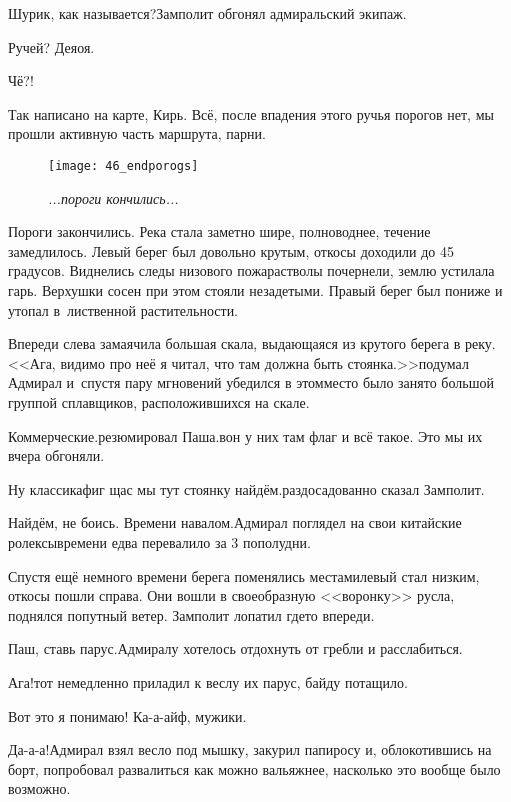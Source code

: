 \diagdash Шурик, как называется?\mdash Замполит обгонял адмиральский экипаж.

\diagdash Ручей? Деяоя.

\diagdash Чё?!

\diagdash Так написано на карте, Кирь. Всё, после впадения этого ручья порогов нет, мы прошли активную часть маршрута, парни.

\begin{figure}[h]
	\centering
	\texttt{[image: 46\_endporogs]}
	\caption{\small\textit{...пороги кончились...}}
\end{figure}

Пороги закончились. Река стала заметно шире, полноводнее, течение замедлилось. Левый берег был довольно крутым, откосы доходили до 45 градусов. Виднелись следы низового пожара\mdash стволы почернели, землю устилала гарь. Верхушки сосен при этом стояли незадетыми. Правый берег был пониже и утопал в~лиственной растительности. 

Впереди слева замаячила большая скала, выдающаяся из крутого берега в реку. <<Ага, видимо про неё я читал, что там должна быть стоянка.>>\mdash подумал Адмирал и~спустя пару мгновений убедился в этом\mdash место было занято большой группой сплавщиков, расположившихся на скале.

\diagdash Коммерческие.\mdash резюмировал Паша.\mdash вон у них там флаг и всё такое. Это мы их вчера обгоняли.

\diagdash Ну классика\mdash фиг щас мы тут стоянку найдём.\mdash раздосадованно сказал Замполит.

\diagdash Найдём, не боись. Времени навалом.\mdash Адмирал поглядел на свои китайские ролексы\mdash времени едва перевалило за 3 пополудни.

Спустя ещё немного времени берега поменялись местами\mdash левый стал низким, откосы пошли справа. Они вошли в своеобразную <<воронку>> русла, поднялся попутный ветер. Замполит лопатил где\sdash то впереди.

\diagdash Паш, ставь парус.\mdash Адмиралу хотелось отдохнуть от гребли и расслабиться.

\diagdash Ага!\mdash тот немедленно приладил к веслу их парус, байду потащило.

\diagdash Вот это я понимаю! Ка-а-айф, мужики.

\diagdash Да-а-а!\mdash Адмирал взял весло под мышку, закурил папиросу и, облокотившись на борт, попробовал развалиться как можно вальяжнее, насколько это вообще было возможно. 

